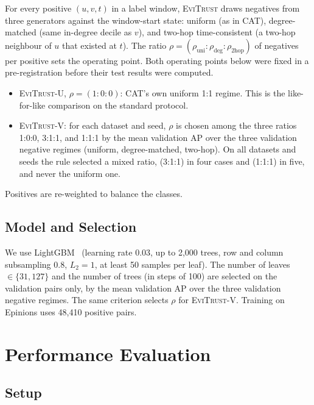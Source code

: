 \documentclass[conference]{IEEEtran}
\newcommand{\evi}{\textsc{EviTrust}}
\newcommand{\eviU}{\textsc{EviTrust}-U}
\newcommand{\eviV}{\textsc{EviTrust}-V}
\begin{document}
For every positive $(u,v,t)$ in a label window, \evi{} draws negatives from three generators against the window-start state: uniform (as in CAT), degree-matched (same in-degree decile as $v$), and two-hop time-consistent (a two-hop neighbour of $u$ that existed at $t$). The ratio $\rho=(\rho_{\text{uni}}:\rho_{\text{deg}}:\rho_{\text{2hop}})$ of negatives per positive sets the operating point. Both operating points below were fixed in a pre-registration before their test results were computed.
\begin{itemize}
\item \eviU{}, $\rho=(1{:}0{:}0)$: CAT's own uniform 1:1 regime. This is the like-for-like comparison on the standard protocol.
\item \eviV{}: for each dataset and seed, $\rho$ is chosen among the three ratios 1:0:0, 3:1:1, and 1:1:1 by the mean validation AP over the three validation negative regimes (uniform, degree-matched, two-hop). On all datasets and seeds the rule selected a mixed ratio, (3:1:1) in four cases and (1:1:1) in five, and never the uniform one.
\end{itemize}
Positives are re-weighted to balance the classes.

\subsection{Model and Selection}

We use LightGBM~\cite{ke2017lightgbm} (learning rate 0.03, up to 2{,}000 trees, row and column subsampling 0.8, $L_2=1$, at least 50 samples per leaf). The number of leaves $\in\{31,127\}$ and the number of trees (in steps of 100) are selected on the validation pairs only, by the mean validation AP over the three validation negative regimes. The same criterion selects $\rho$ for \eviV{}. Training on Epinions uses 48{,}410 positive pairs.

\section{Performance Evaluation}
\label{sec:eval}

\subsection{Setup}
\end{document}
